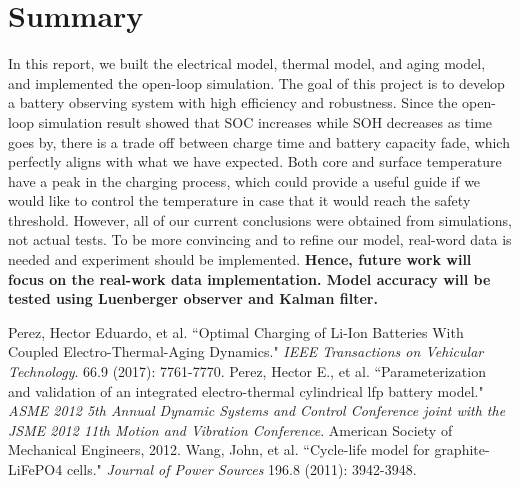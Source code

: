 \documentclass[10pt]{article}
\begin{document}
\section{Summary}
In this report, we built the electrical model, thermal model, and aging model, and implemented the open-loop simulation. The goal of this project is to develop a battery observing system with high efficiency and robustness. Since the open-loop simulation result showed that SOC increases while SOH decreases as time goes by, there is a trade off between charge time and battery capacity fade, which perfectly aligns with what we have expected. Both core and surface temperature have a peak in the charging process, which could provide a useful guide if we would like to control the temperature in case that it would reach the safety threshold. However, all of our current conclusions were obtained from simulations, not actual tests. To be more convincing and to refine our model, real-word data is needed and experiment should be implemented. \textbf{Hence, future work will focus on the real-work data implementation. Model accuracy will be tested using Luenberger observer and Kalman filter.} 
\begin{thebibliography}{9}
Perez, Hector Eduardo, et al.
``Optimal Charging of Li-Ion Batteries With Coupled Electro-Thermal-Aging Dynamics." 
\textit{IEEE Transactions on Vehicular Technology}. 
66.9 (2017): 7761-7770.
Perez, Hector E., et al.
``Parameterization and validation of an integrated electro-thermal cylindrical lfp battery model."
\textit{ASME 2012 5th Annual Dynamic Systems and Control Conference joint with the JSME 2012 11th Motion and Vibration Conference}. 
American Society of Mechanical Engineers, 2012.
Wang, John, et al. 
``Cycle-life model for graphite-LiFePO4 cells." \textit{Journal of Power Sources}
196.8 (2011): 3942-3948.
\end{thebibliography}
\end{document}

